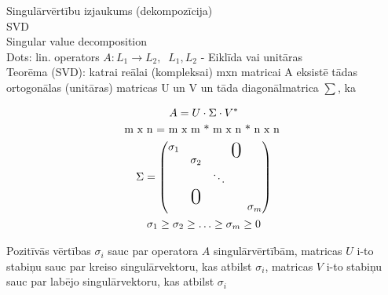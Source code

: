 \documentclass[12pt]{article}
\begin{document}
 
 Singulārvērtību izjaukums (dekompozīcija) \\
 SVD \\
 
Singular value decomposition \\

Dots: lin. operators $A : L_1 \rightarrow L_2 , \; \; L_1, L_2$ - Eiklīda vai unitāras \\

Teorēma (SVD): katrai reālai (kompleksai) mxn matricai A eksistē tādas ortogonālas (unitāras) matricas U un V un tāda  diagonālmatrica $\sum$, ka

\begin{gather*}
 A = U \cdot \Sigma \cdot V^{*} \\
 \text{m x n = m x m * m x n * n x n }\\
 \Sigma   = 
 \begin{pmatrix}
 	\sigma_1 & && \bigzero   \\ 
    	& \sigma_2 &  \\
	& &  \ddots  &\\ 
        & \bigzero  &  \\
    	& &  & &  \sigma_m  \\ 
 \end{pmatrix} \\
 \sigma_1 \geq \sigma_2 \geq \ldots  \geq \sigma_m \geq 0\\
 \end{gather*}
 
Pozitīvās vērtības $\sigma_i$ sauc par operatora $A$ singulārvērtībām, matricas $U$ i-to stabiņu sauc par kreiso singulārvektoru, kas atbilst $\sigma_i$, matricas $V$ i-to stabiņu sauc par labējo singulārvektoru, kas atbilst $\sigma_i$\\

\pagebreak

 
\end{document}
